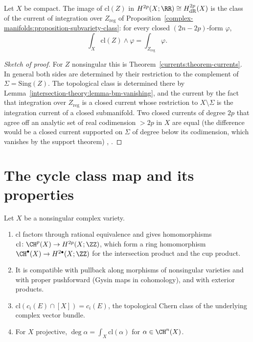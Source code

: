 \begin{proposition}\label{intersection-theory:proposition-current}
Let $X$ be compact. The image of $\mathrm{cl}(Z)$ in $H^{2p}(X; \RR) \cong H^{2p}_{\mathrm{dR}}(X)$ is the class of the current of integration over $Z_{\mathrm{reg}}$ of
Proposition~\ref{complex-manifolds:proposition-subvariety-class}: for every closed $(2n - 2p)$-form $\varphi$,
\[
\int_X\mathrm{cl}(Z) \wedge \varphi = \int_{Z_{\mathrm{reg}}}\varphi .
\]
\end{proposition}

\begin{proof}[Sketch of proof]
For $Z$ nonsingular this is Theorem~\ref{currents:theorem-currents}. In general both sides are determined by their restriction to the complement of $\Sigma = \mathrm{Sing}(Z)$. The
topological class is determined there by Lemma~\ref{intersection-theory:lemma-bm-vanishing}, and the current by the fact that integration over $Z_{\mathrm{reg}}$ is a closed current whose
restriction to $X \setminus \Sigma$ is the integration current of a closed submanifold. Two closed currents of degree $2p$ that agree off an analytic set of real codimension
$> 2p$ in $X$ are equal (the difference would be a closed current supported on $\Sigma$ of degree below its codimension, which vanishes by the support theorem) \cite[Chapter 3]{griffiths-harris},
\cite[Section 11.1]{voisin-hodge-1}.
\end{proof}

\section{The cycle class map and its properties}\label{intersection-theory:section-properties}

\begin{theorem}\label{intersection-theory:theorem-cycle-class}
Let $X$ be a nonsingular complex variety.
\begin{enumerate}
\item $\mathrm{cl}$ factors through rational equivalence and gives homomorphisms $\mathrm{cl} \colon \CH^p(X) \to H^{2p}(X; \ZZ)$, which form a ring homomorphism
$\CH^\bullet(X) \to H^{2\bullet}(X; \ZZ)$ for the intersection product and the cup product.
\item It is compatible with pullback along morphisms of nonsingular varieties and with proper pushforward (Gysin maps in cohomology), and with exterior products.
\item $\mathrm{cl}(c_i(E) \cap [X]) = c_i(E)$, the topological Chern class of the underlying complex vector bundle.
\item For $X$ projective, $\deg\alpha = \int_X\mathrm{cl}(\alpha)$ for $\alpha \in \CH^n(X)$.
\end{enumerate}
\end{theorem}

